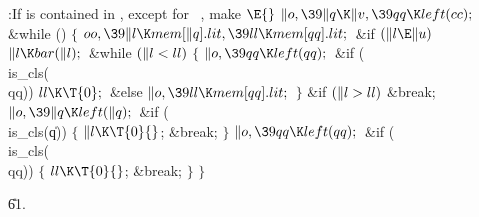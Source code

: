 \B{}:If  is contained in , except for~%
, make \X${}\E{}$\6
$\|o,\39\|q\K\|v,\39\\{qq}\K\\{left}(\\{cc});{}$\6
\&{while} ()\5
${}\{{}$\1\6
${}\\{oo},\39\|l\K\\{mem}[\|q].\\{lit},\39\\{ll}\K\\{mem}[\\{qq}].\\{lit};{}$\6
\&{if} ${}(\|l\E\|u){}$\1\5
${}\|l\K\\{bar}(\|l);{}$\2\6
\&{while} ${}(\|l<\\{ll}){}$\5
${}\{{}$\1\6
${}\|o,\39\\{qq}\K\\{left}(\\{qq});{}$\6
\&{if} (\\{is\_cls}(\\{qq}))\1\5
${}\\{ll}\K\T{0};{}$\2\6
\&{else}\1\5
${}\|o,\39\\{ll}\K\\{mem}[\\{qq}].\\{lit};{}$\2\6
\4${}\}{}$\2\6
\&{if} ${}(\|l>\\{ll}){}$\1\5
\&{break};\2\6
${}\|o,\39\|q\K\\{left}(\|q);{}$\6
\&{if} (\\{is\_cls}(\|q))\5
${}\{{}$\1\6
${}\|l\K\T{0}{}$;\5
\&{break};\6
\4${}\}{}$\2\6
${}\|o,\39\\{qq}\K\\{left}(\\{qq});{}$\6
\&{if} (\\{is\_cls}(\\{qq}))\5
${}\{{}$\1\6
${}\\{ll}\K\T{0}{}$;\5
\&{break};\6
\4${}\}{}$\2\6
\4${}\}{}$\2\par
\U61.\fi

